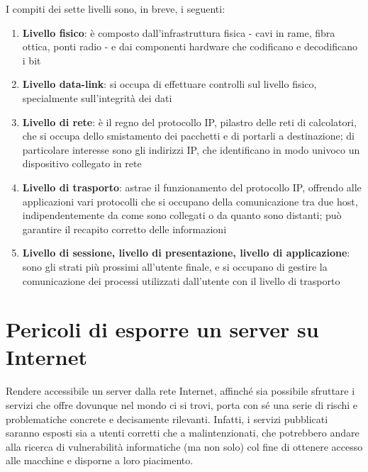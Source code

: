 I compiti dei sette livelli sono, in breve, i seguenti:
\begin{enumerate}
    \item \textbf{Livello fisico}: è composto dall'infrastruttura fisica - cavi in rame, fibra ottica, ponti radio - e dai componenti hardware che codificano e decodificano i bit
    \item \textbf{Livello data-link}: si occupa di effettuare controlli sul livello fisico, specialmente sull'integrità dei dati
    \item \textbf{Livello di rete}: è il regno del protocollo IP, pilastro delle reti di calcolatori, che si occupa dello smistamento dei pacchetti e di portarli a destinazione; di particolare interesse sono gli indirizzi IP, che identificano in modo univoco un dispositivo collegato in rete
    \item \textbf{Livello di trasporto}: astrae il funzionamento del protocollo IP, offrendo alle applicazioni vari protocolli che si occupano della comunicazione tra due host, indipendentemente da come sono collegati o da quanto sono distanti; può garantire il recapito corretto delle informazioni
    \item \textbf{Livello di sessione, livello di presentazione, livello di applicazione}: sono gli strati più prossimi all'utente finale, e si occupano di gestire la comunicazione dei processi utilizzati dall'utente con il livello di trasporto
\end{enumerate}

\section{Pericoli di esporre un server su Internet}
Rendere accessibile un server dalla rete Internet, affinché sia possibile sfruttare i servizi che offre dovunque nel mondo ci si trovi, porta con sé una serie di rischi e problematiche concrete e decisamente rilevanti.
Infatti, i servizi pubblicati saranno esposti sia a utenti corretti che a malintenzionati, che potrebbero andare alla ricerca di vulnerabilità informatiche (ma non solo) col fine di ottenere accesso alle macchine e disporne a loro piacimento.


